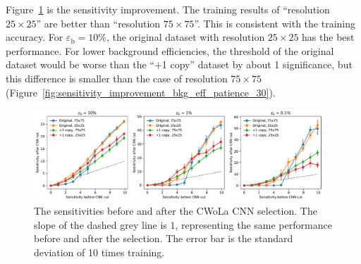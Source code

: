 \documentclass[12pt]{article}
\begin{document}
		Figure~\ref{fig:sensitivity_improvement_bkg_eff_resolution_25} is the sensitivity improvement. The training results of ``resolution $25\times 25$'' are better than ``resolution $75\times 75$''. This is consistent with the training accuracy. For $\varepsilon_{\text{b}} = 10 \%$, the original dataset with resolution $25\times 25$ has the best performance. For lower background efficiencies, the threshold of the original dataset would be worse than the ``+1 copy'' dataset by about 1 significance, but this difference is smaller than the case of resolution $75\times 75$ (Figure~\ref{fig:sensitivity_improvement_bkg_eff_patience_30}).
		\begin{figure}[htpb]
			\centering
			\includegraphics[width=0.97\textwidth]{HVmodel_sensitivity_improvement_bkg_eff_origin_copy_1_res_75_25.pdf}
			\caption{The sensitivities before and after the CWoLa CNN selection. The slope of the dashed grey line is $1$, representing the same performance before and after the selection. The error bar is the standard deviation of 10 times training.}
			\label{fig:sensitivity_improvement_bkg_eff_resolution_25}
		\end{figure}
\end{document}
